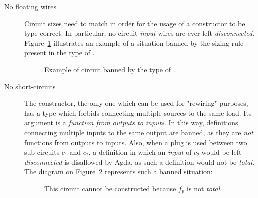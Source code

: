             \begin{description}
                \item[No floating wires] Circuit sizes need to match in order for the usage of a constructor
                    to be type-correct. In particular, no circuit \emph{input} wires are ever left \emph{disconnected}.
                    Figure~\ref{fig:sequencing-floating} illustrates an example of a situation banned by the sizing rule present
                    in the type of .

                    \begin{figure}[h]
                        \caption{Example of circuit banned by the type of .\label{fig:sequencing-floating}}
                    \end{figure}

                \item [No short-circuits] The  constructor, the only one which can be used for
                    "rewiring" purposes, has a type which forbids connecting multiple sources to the same load.
                    Its argument is a \emph{function from outputs to inputs}.
                    In this way, definitions connecting multiple inputs to the same output are banned,
                    as they are \emph{not} functions from outputs to inputs.
                    Also, when a plug is used between two sub-circuits $c₁$ and $c₂$,
                    a definition in which an \emph{input} of $c₂$ would be left \emph{disconnected} is disallowed by Agda,
                    as such a definition would not be \emph{total}.
                    The diagram on Figure~\ref{fig:plug-seq-disconnected-input} represents such a banned situation:

                    \begin{figure}[h]
                        \caption{This circuit cannot be constructed because $f_{p}$ is not \emph{total}.\label{fig:plug-seq-disconnected-input}}
                    \end{figure}
            \end{description}

